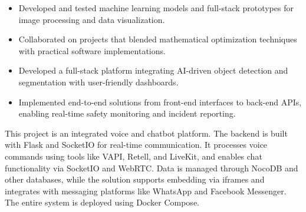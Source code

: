 \documentclass[10pt,a4paper]{altacv}
\begin{document}
\begin{CJK*}{UTF8}{bsmi}
\divider

\begin{itemize}
\item Developed and tested machine learning models and full-stack prototypes for image processing and data visualization.
\item Collaborated on projects that blended mathematical optimization techniques with practical software implementations.
\end{itemize}


\begin{itemize}
\item Developed a full-stack platform integrating AI-driven object detection and segmentation with user-friendly dashboards.
\item Implemented end-to-end solutions from front-end interfaces to back-end APIs, enabling real-time safety monitoring and incident reporting.
\end{itemize}

\divider

\begin{itemize}
This project is an integrated voice and chatbot platform. The backend is built with Flask and SocketIO for real-time communication. It processes voice commands using tools like VAPI, Retell, and LiveKit, and enables chat functionality via SocketIO and WebRTC. Data is managed through NocoDB and other databases, while the solution supports embedding via iframes and integrates with messaging platforms like WhatsApp and Facebook Messenger. The entire system is deployed using Docker Compose.
\end{itemize}



\end{CJK*}
\end{document}
